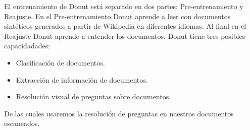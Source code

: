 \documentclass[../main.tex]{subfiles}
\begin{document}
El entrenamiento de Donut está separado en dos partes: Pre-entrenamiento y Reajuste.
En el Pre-entrenamiento Donut aprende a leer con documentos sintéticos generados a partir de Wikipedia en diferentes idiomas.
Al final en el Reajuste Donut aprende a entender los documentos.
Donut tiene tres posibles capacidadades:
\begin{itemize}
	\item Clasificación de documentos.
	\item Extracción de información de documentos.
	\item Resolución visual de preguntas sobre documentos.
\end{itemize}

De las cuales usaremos la resolución de preguntas en nuestros documentos escaneados.
\end{document}
